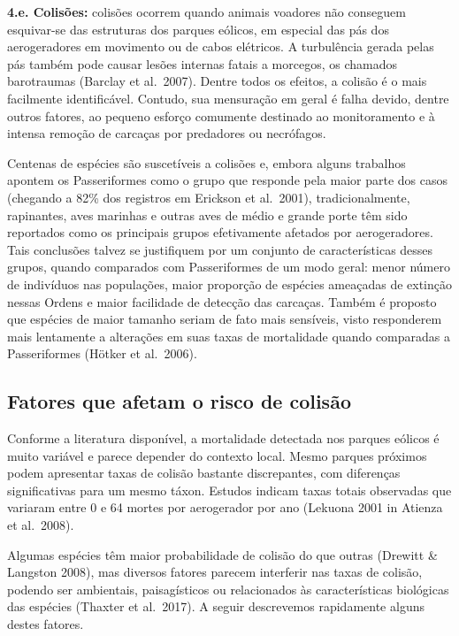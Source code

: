 \documentclass[
  oneside]{scrbook}
\begin{document}
\textbf{4.e. Colisões:} colisões ocorrem quando animais voadores não conseguem esquivar-se das estruturas dos parques eólicos, em especial das pás dos aerogeradores em movimento ou de cabos elétricos. A turbulência gerada pelas pás também pode causar lesões internas fatais a morcegos, os chamados barotraumas (Barclay et al.~2007). Dentre todos os efeitos, a colisão é o mais facilmente identificável. Contudo, sua mensuração em geral é falha devido, dentre outros fatores, ao pequeno esforço comumente destinado ao monitoramento e à intensa remoção de carcaças por predadores ou necrófagos.

Centenas de espécies são suscetíveis a colisões e, embora alguns trabalhos apontem os Passeriformes como o grupo que responde pela maior parte dos casos (chegando a 82\% dos registros em Erickson et al.~2001), tradicionalmente, rapinantes, aves marinhas e outras aves de médio e grande porte têm sido reportados como os principais grupos efetivamente afetados por aerogeradores. Tais conclusões talvez se justifiquem por um conjunto de características desses grupos, quando comparados com Passeriformes de um modo geral: menor número de indivíduos nas populações, maior proporção de espécies ameaçadas de extinção nessas Ordens e maior facilidade de detecção das carcaças. Também é proposto que espécies de maior tamanho seriam de fato mais sensíveis, visto responderem mais lentamente a alterações em suas taxas de mortalidade quando comparadas a Passeriformes (Hötker et al.~2006).

\hypertarget{fatores}{%
\subsection{Fatores que afetam o risco de colisão}\label{fatores}}

Conforme a literatura disponível, a mortalidade detectada nos parques eólicos é muito variável e parece depender do contexto local. Mesmo parques próximos podem apresentar taxas de colisão bastante discrepantes, com diferenças significativas para um mesmo táxon. Estudos indicam taxas totais observadas que variaram entre 0 e 64 mortes por aerogerador por ano (Lekuona 2001 in Atienza et al.~2008).

Algumas espécies têm maior probabilidade de colisão do que outras (Drewitt \& Langston 2008), mas diversos fatores parecem interferir nas taxas de colisão, podendo ser ambientais, paisagísticos ou relacionados às características biológicas das espécies (Thaxter et al.~2017). A seguir descrevemos rapidamente alguns destes fatores.
\end{document}
